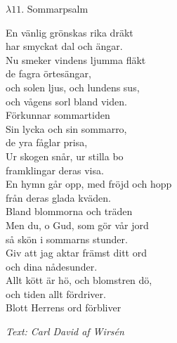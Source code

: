 \documentclass[a6paper,10pt]{article}
\newcommand{\notis}[1]{\begin{flushright}\textit{#1}\end{flushright}}
\begin{document}
\setlength{\oddsidemargin}{-0.47in}
\noindent
\begin{center}
\Large $\lambda11$. Sommarpsalm\\
\end{center}
En vänlig grönskas rika dräkt\\
har smyckat dal och ängar.\\
Nu smeker vindens ljumma fläkt\\
de fagra örtesängar,\\
och solen ljus, och lundens sus,\\
och vågens sorl bland viden.\\
Förkunnar sommartiden
\vspace{5pt}\\
Sin lycka och sin sommarro,\\
de yra fåglar prisa,\\
Ur skogen snår, ur stilla bo\\
framklingar deras visa.\\
En hymn går opp, med fröjd och hopp\\
från deras glada kväden.\\
Bland blommorna och träden
\vspace{5pt}\\
Men du, o Gud, som gör vår jord\\
så skön i sommarns stunder.\\
Giv att jag aktar främst ditt ord\\
och dina nådesunder.\\
Allt kött är hö, och blomstren dö,\\
och tiden allt fördriver.\\
Blott Herrens ord förbliver
\notis{Text: Carl David af Wirsén}
\end{document}
